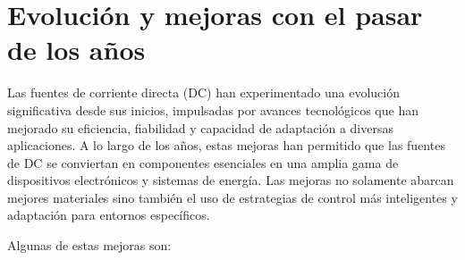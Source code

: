 \section{Evolución y mejoras con el pasar de los años}\par 
Las fuentes de corriente directa (DC) han experimentado una evolución significativa desde sus inicios, impulsadas por avances tecnológicos que han mejorado su eficiencia, fiabilidad y capacidad de adaptación a diversas aplicaciones. A lo largo de los años, estas mejoras han permitido que las fuentes de DC se conviertan en componentes esenciales en una amplia gama de dispositivos electrónicos y sistemas de energía. Las mejoras no solamente abarcan mejores materiales sino también el uso de estrategias de control más inteligentes y adaptación para entornos específicos.\par 
Algunas de estas mejoras son:
